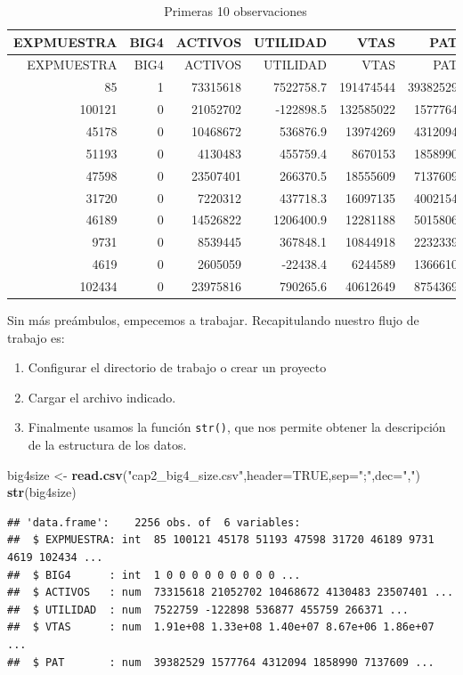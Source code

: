 \documentclass[]{book}
\newenvironment{Shaded}{\begin{snugshade}}{\end{snugshade}}
\newcommand{\DataTypeTok}[1]{\textcolor[rgb]{0.13,0.29,0.53}{#1}}
\newcommand{\KeywordTok}[1]{\textcolor[rgb]{0.13,0.29,0.53}{\textbf{#1}}}
\newcommand{\NormalTok}[1]{#1}
\newcommand{\OtherTok}[1]{\textcolor[rgb]{0.56,0.35,0.01}{#1}}
\newcommand{\StringTok}[1]{\textcolor[rgb]{0.31,0.60,0.02}{#1}}
\providecommand{\tightlist}{%
  \setlength{\itemsep}{0pt}\setlength{\parskip}{0pt}}
\begin{document}
\newpage

\begin{longtable}[]{@{}rrrrrr@{}}
\caption{\label{tab:tabla1}Primeras 10 observaciones}\tabularnewline
\toprule
EXPMUESTRA & BIG4 & ACTIVOS & UTILIDAD & VTAS & PAT\tabularnewline
\midrule
\endfirsthead
\toprule
EXPMUESTRA & BIG4 & ACTIVOS & UTILIDAD & VTAS & PAT\tabularnewline
\midrule
\endhead
85 & 1 & 73315618 & 7522758.7 & 191474544 & 39382529\tabularnewline
100121 & 0 & 21052702 & -122898.5 & 132585022 & 1577764\tabularnewline
45178 & 0 & 10468672 & 536876.9 & 13974269 & 4312094\tabularnewline
51193 & 0 & 4130483 & 455759.4 & 8670153 & 1858990\tabularnewline
47598 & 0 & 23507401 & 266370.5 & 18555609 & 7137609\tabularnewline
31720 & 0 & 7220312 & 437718.3 & 16097135 & 4002154\tabularnewline
46189 & 0 & 14526822 & 1206400.9 & 12281188 & 5015806\tabularnewline
9731 & 0 & 8539445 & 367848.1 & 10844918 & 2232339\tabularnewline
4619 & 0 & 2605059 & -22438.4 & 6244589 & 1366610\tabularnewline
102434 & 0 & 23975816 & 790265.6 & 40612649 & 8754369\tabularnewline
\bottomrule
\end{longtable}

Sin más preámbulos, empecemos a trabajar. Recapitulando nuestro flujo de trabajo es:

\begin{enumerate}
\def\labelenumi{\arabic{enumi}.}
\tightlist
\item
  Configurar el directorio de trabajo o crear un proyecto
\item
  Cargar el archivo indicado.
\item
  Finalmente usamos la función \texttt{str()}, que nos permite obtener la descripción de la estructura de los datos.
\end{enumerate}

\begin{Shaded}
\begin{Highlighting}[]
\NormalTok{big4size <-}\StringTok{ }\KeywordTok{read.csv}\NormalTok{(}\StringTok{"cap2_big4_size.csv"}\NormalTok{,}\DataTypeTok{header=}\OtherTok{TRUE}\NormalTok{,}\DataTypeTok{sep=}\StringTok{";"}\NormalTok{,}\DataTypeTok{dec=}\StringTok{","}\NormalTok{)}
\KeywordTok{str}\NormalTok{(big4size)}
\end{Highlighting}
\end{Shaded}

\begin{verbatim}
## 'data.frame':    2256 obs. of  6 variables:
##  $ EXPMUESTRA: int  85 100121 45178 51193 47598 31720 46189 9731 4619 102434 ...
##  $ BIG4      : int  1 0 0 0 0 0 0 0 0 0 ...
##  $ ACTIVOS   : num  73315618 21052702 10468672 4130483 23507401 ...
##  $ UTILIDAD  : num  7522759 -122898 536877 455759 266371 ...
##  $ VTAS      : num  1.91e+08 1.33e+08 1.40e+07 8.67e+06 1.86e+07 ...
##  $ PAT       : num  39382529 1577764 4312094 1858990 7137609 ...
\end{verbatim}
\end{document}
